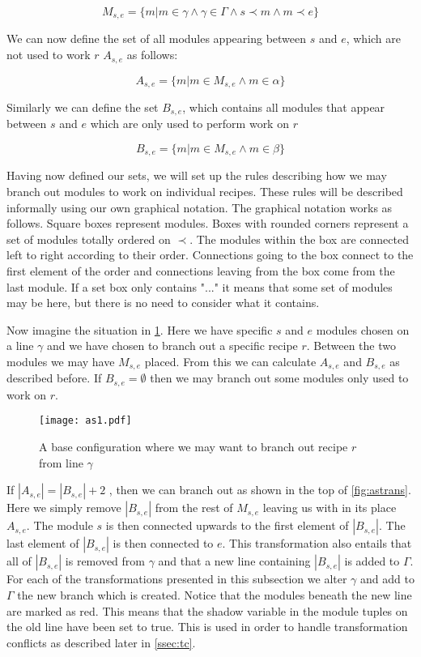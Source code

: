 \[M_{s,e} = \{m | m \in \gamma \land \gamma \in \Gamma \land s \prec m \land m \prec e\}\]

We can now define the set of all modules appearing between $s$ and $e$, which are not used to work $r$ $A_{s,e}$ as follows: 

\[A_{s,e} = \{m |m \in M_{s,e} \land m \in \alpha\}\]

Similarly we can define the set $B_{s,e}$, which contains all modules that appear between $s$ and $e$ which are only used to perform work on $r$

\[B_{s,e} = \{m |m \in M_{s,e} \land m \in \beta\}\]

Having now defined our sets, we will set up the rules describing how we may branch out modules to work on individual recipes. These rules will be described informally using our own graphical notation. The graphical notation works as follows. Square boxes represent modules. Boxes with rounded corners represent a set of modules totally ordered on $\prec$. The modules within the box are connected left to right according to their order. Connections going to the box connect to the first element of the order and connections leaving from the box come from the last module. If a set box only contains "..." it means that some set of modules may be here, but there is no need to consider what it contains. 

Now imagine the situation in \cref{fig:asbase}. Here we have specific $s$ and $e$ modules chosen on a line $\gamma$ and we have chosen to branch out a specific recipe $r$. Between the two modules we may have $M_{s,e}$ placed. From this we can calculate $A_{s,e}$ and $B_{s,e}$ as described before. If $B_{s,e} = \emptyset$ then we may branch out some modules only used to work on $r$. 

\begin{figure}[h]
\centering
\texttt{[image: as1.pdf]}
\caption{A base configuration where we may want to branch out recipe $r$ from line $\gamma$}
\label{fig:asbase}
\end{figure}

If $|A_{s,e}| = |B_{s,e}| + 2$ , then we can branch out as shown in the top of \cref{fig:astrans}. Here we simply remove $|B_{s,e}|$ from the rest of $M_{s,e}$ leaving us with in its place $A_{s,e}$. The module $s$ is then connected upwards to the first element of $|B_{s,e}|$. The last element of $|B_{s,e}|$ is then connected to $e$. This transformation also entails that all of  $|B_{s,e}|$ is removed from $\gamma$ and that a new line containing $|B_{s,e}|$ is added to $\Gamma$. For each of the transformations presented in this subsection we alter $\gamma$ and add to $\Gamma$ the new branch which is created.  Notice that the modules beneath the new line are marked as red. This means that the shadow variable in the module tuples on the old line have been set to true. This is used in order to handle transformation conflicts as described later in \cref{ssec:tc}.

